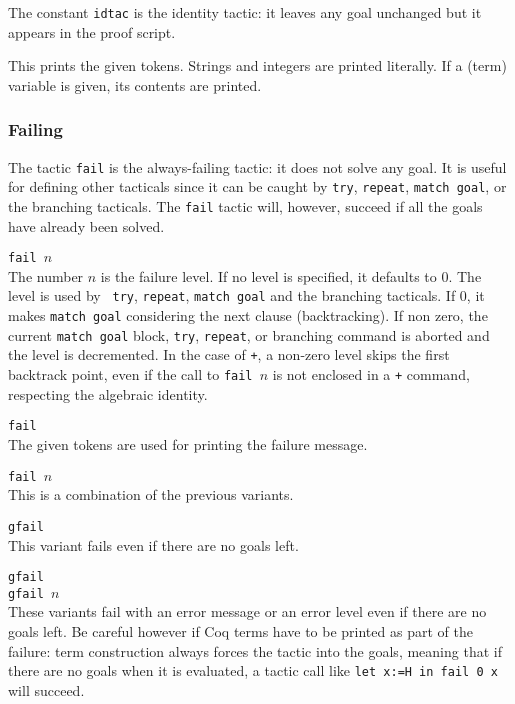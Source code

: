 The constant {\tt idtac} is the identity tactic: it leaves any goal
unchanged but it appears in the proof script.


This prints the given tokens. Strings and integers are printed
literally. If a (term) variable is given, its contents are printed.


\subsubsection[Failing]{Failing
}

The tactic {\tt fail} is the always-failing tactic: it does not solve
any goal. It is useful for defining other tacticals since it can be
caught by {\tt try}, {\tt repeat}, {\tt match goal}, or the branching
tacticals. The {\tt fail} tactic will, however, succeed if all the
goals have already been solved.

\begin{Variants}
\item {\tt fail $n$}\\ The number $n$ is the failure level. If no
  level is specified, it defaults to $0$.  The level is used by {\tt
    try}, {\tt repeat}, {\tt match goal} and the branching tacticals.
  If $0$, it makes {\tt match goal} considering the next clause
  (backtracking). If non zero, the current {\tt match goal} block,
  {\tt try}, {\tt repeat}, or branching command is aborted and the
  level is decremented. In the case of {\tt +}, a non-zero level skips
  the first backtrack point, even if the call to {\tt fail $n$} is not
  enclosed in a {\tt +} command, respecting the algebraic identity.

\item {\tt fail \nelist{\messagetoken}{}}\\
The given tokens are used for printing the failure message.

\item {\tt fail $n$ \nelist{\messagetoken}{}}\\
This is a combination of the previous variants.

\item {\tt gfail}\\
This variant fails even if there are no goals left.

\item {\tt gfail \nelist{\messagetoken}{}}\\
{\tt gfail $n$ \nelist{\messagetoken}{}}\\
These variants fail with an error message or an error level even if
there are no goals left. Be careful however if Coq terms have to be
printed as part of the failure: term construction always forces the
tactic into the goals, meaning that if there are no goals when it is
evaluated, a tactic call like {\tt let x:=H in fail 0 x} will succeed.

\end{Variants}


